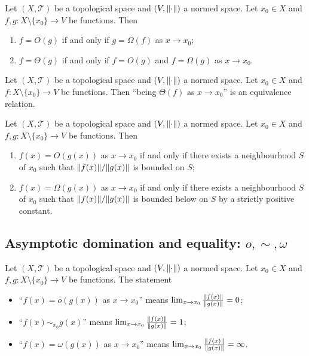 \begin{lemma}
Let $(X,\mathcal{T})$ be a topological space and $(V,\lVert\cdot\rVert)$ a normed space. Let $x_0 \in X$ and $f,g: X\setminus\{x_0\}\to V$ be functions. Then
\begin{enumerate}
\item $f = O(g)$ \textup{if and only if} $g = \Omega(f)$ as $x\to x_0$;
\item $f = \Theta(g)$ \textup{if and only if} $f = O(g)$ and $f = \Omega(g)$ as $x\to x_0$.
\end{enumerate}
\end{lemma}

\begin{lemma}
Let $(X,\mathcal{T})$ be a topological space and $(V,\lVert\cdot\rVert)$ a normed space. Let $x_0 \in X$ and $f: X\setminus\{x_0\}\to V$ be functions. Then ``being $\Theta(f)$ as $x\to x_0$'' is an equivalence relation.
\end{lemma}

\begin{lemma}
Let $(X,\mathcal{T})$ be a topological space and $(V,\lVert\cdot\rVert)$ a normed space. Let $x_0 \in X$ and $f,g: X\setminus\{x_0\}\to V$ be functions. Then
\begin{enumerate}
\item $f(x) = O(g(x))$ as $x\to x_0$ \textup{if and only if} there exists a neighbourhood $S$ of $x_0$ such that $\lVert f(x)\rVert/\lVert g(x)\rVert$ is bounded on $S$;
\item $f(x) = \Omega(g(x))$ as $x\to x_0$ \textup{if and only if} there exists a neighbourhood $S$ of $x_0$ such that $\lVert f(x)\rVert/\lVert g(x)\rVert$ is bounded below on $S$ by a strictly positive constant.
\end{enumerate}
\end{lemma}

\subsection{Asymptotic domination and equality: $o,\sim,\omega$}
\begin{definition}
Let $(X,\mathcal{T})$ be a topological space and $(V,\lVert\cdot\rVert)$ a normed space. Let $x_0 \in X$ and $f,g: X\setminus\{x_0\}\to V$ be functions. The statement
\begin{itemize}
\item ``$f(x) = o(g(x))$ as $x\to x_0$'' means $\lim_{x\to x_0} \frac{\lVert f(x)\rVert}{\lVert g(x)\rVert} = 0$;
\item ``$f(x) \sim_{x_0} g(x)$'' means $\lim_{x\to x_0} \frac{\lVert f(x)\rVert}{\lVert g(x)\rVert} = 1$;
\item ``$f(x) = \omega(g(x))$ as $x\to x_0$'' means $\lim_{x\to x_0} \frac{\lVert f(x)\rVert}{\lVert g(x)\rVert} = \infty$.
\end{itemize}
\end{definition}

